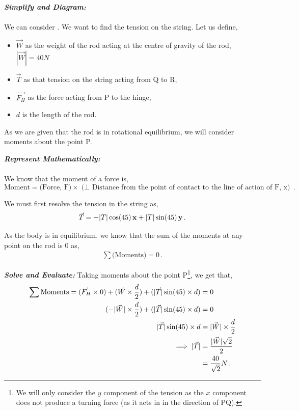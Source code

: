 \begin{subquestions}
\begin{subsubquestions}
\subsubquestion

\textbf{\textit{Simplify and Diagram:}} \\ \\
We can consider . We want to find the tension on the string. Let us define,
\begin{itemize}
	\item $\vec{W}$ as the weight of the rod acting at the centre of gravity of the rod, $|\vec{W}|=40N$
	\item $\vec{T}$ as that tension on the string acting from Q to R,
	\item $\vec{F_H}$ as the force acting from P to the hinge,
	\item $d$ is the length of the rod.
\end{itemize}
As we are given that the rod is in rotational equilibrium, we will consider moments about the point P.




\textbf{\textit{Represent Mathematically:}} \\ \\
We know that the moment of a force is,
\begin{equation}
	\text{Moment} = \text{(Force, F)} \times \text{($\perp$ Distance from the point of contact to the line of action of F, x)} \,.
\end{equation}

We must first resolve the tension in the string as,
\begin{equation}
	\vec{T} = -|T|\cos(45)\,\mathbf{x} + |T|\sin(45)\,\mathbf{y} \,.
\end{equation}

As the body is in equilibrium, we know that the sum of the moments at any point on the rod is 0 as,
\begin{align}
	\sum \text{(Moments)} = 0 \,.
\end{align}




\textbf{\textit{Solve and Evaluate:}}
Taking moments about the point P\footnote{We will only consider the $y$ component of the tension as the $x$ component does not produce a turning force (as it acts in in the direction of PQ).}, we get that,
\begin{align}
	\sum \text{Moments} = (\vec{F_H}\times 0) + (\vec{W} \times \frac{d}{2}) + (|\vec{T}|\sin(45) \times d) & = 0 \nonumber \\
	                                             (-|\vec{W}| \times \frac{d}{2}) + (|\vec{T}|\sin(45) \times d) & = 0 \nonumber \\
	                                                                |\vec{T}|\sin(45) \times d & = |\vec{W}| \times \frac{d}{2} \nonumber \\
	                                                                \implies |\vec{T}| & = \frac{|\vec{W}|\sqrt{2}}{2} \nonumber \\
	                                                                             & = \frac{40}{\sqrt{2}}N \,. 
\end{align}


\end{subsubquestions}
\end{subquestions}

